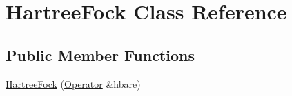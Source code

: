 \hypertarget{classHartreeFock}{}\section{Hartree\+Fock Class Reference}
\label{classHartreeFock}
\subsection*{Public Member Functions}
\begin{DoxyCompactItemize}
\item 
\hyperlink{classHartreeFock_ad39d695b75dc9c6aa2f0e1ff81d1adc5}{Hartree\+Fock} (\hyperlink{classOperator}{Operator} \&hbare)\hypertarget{classHartreeFock_ad39d695b75dc9c6aa2f0e1ff81d1adc5}{}\label{classHartreeFock_ad39d695b75dc9c6aa2f0e1ff81d1adc5}


\end{DoxyCompactItemize}
